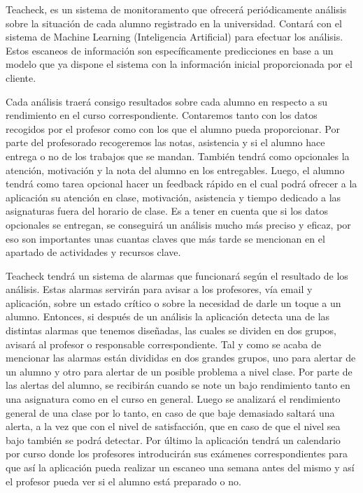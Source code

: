 Teacheck, es un sistema de monitoramento que ofrecerá periódicamente
análisis sobre la situación de cada alumno registrado en la
universidad. Contará con el sistema de Machine Learning (Inteligencia
Artificial) para efectuar los análisis. Estos escaneos de información
son específicamente predicciones en base a un modelo que ya dispone el
sistema con la información inicial proporcionada por el cliente.

Cada análisis traerá consigo resultados sobre cada alumno en respecto
a su rendimiento en el curso correspondiente. Contaremos tanto con los
datos recogidos por el profesor como con los que el alumno pueda
proporcionar. Por parte del profesorado recogeremos las notas,
asistencia y si el alumno hace entrega o no de los trabajos que se
mandan. También tendrá como opcionales la atención, motivación y la
nota del alumno en los entregables. Luego, el alumno tendrá como tarea
opcional hacer un feedback rápido en el cual podrá ofrecer a la
aplicación su atención en clase, motivación, asistencia y tiempo
dedicado a las asignaturas fuera del horario de clase. Es a tener en
cuenta que si los datos opcionales se entregan, se conseguirá un
análisis mucho más preciso y eficaz, por eso son importantes unas
cuantas claves que más tarde se mencionan en el apartado de
actividades y recursos clave.

Teacheck tendrá un sistema de alarmas que funcionará según el
resultado de los análisis. Estas alarmas servirán para avisar a los
profesores, vía email y aplicación, sobre un estado crítico o sobre la
necesidad de darle un toque a un alumno. Entonces, si después de un
análisis la aplicación detecta una de las distintas alarmas que
tenemos diseñadas, las cuales se dividen en dos grupos, avisará al
profesor o responsable correspondiente. Tal y como se acaba de
mencionar las alarmas están divididas en dos grandes grupos, uno para
alertar de un alumno y otro para alertar de un posible problema a
nivel clase. Por parte de las alertas del alumno, se recibirán cuando
se note un bajo rendimiento tanto en una asignatura como en el curso
en general. Luego se analizará el rendimiento general de una clase por
lo tanto, en caso de que baje demasiado saltará una alerta, a la vez
que con el nivel de satisfacción, que en caso de que el nivel sea bajo
también se podrá detectar. Por último la aplicación tendrá un
calendario por curso donde los profesores introducirán sus exámenes
correspondientes para que así la aplicación pueda realizar un escaneo
una semana antes del mismo y así el profesor pueda ver si el alumno
está preparado o no.

